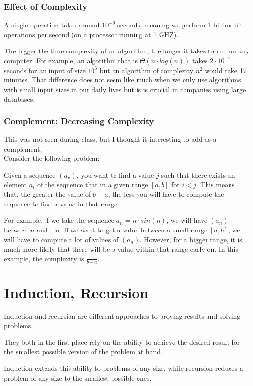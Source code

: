 \documentclass[10pt,a4paper]{book}
\begin{document}
\subsection{Effect of Complexity}
A single operation takes around $10^{-9}$ seconds, meaning we perform 1 billion bit operations per second (on a processor running at 1 GHZ).\par 
The bigger the time complexity of an algorithm, the longer it takes to run on any computer. For example, an algorithm that is $\Theta (n\cdot log(n))$ takes $2\cdot 10^{-2}$ seconds for an input of size $10^6$ but an algorithm of complexity $n^2$ would take 17 minutes. That difference does not seem like much when we only use algorithms with small input sizes in our daily lives but is is crucial in companies using large databases.
\subsection{Complement: Decreasing Complexity}
This was not seen during class, but I thought it interesting to add as a complement. \\
Consider the following problem: \par 
Given a sequence $(a_n)$, you want to find a value $j$ such that there exists an element $a_i$ of the sequence that in a given range $[a,b]$ for $i<j$. This means that, the greater the value of $b-a$, the less you will have to compute the sequence to find a value in that range.\par 
For example, if we take the sequence $a_n = n\cdot sin(n)$, we will have $(a_n)$ between $n$ and $-n$. If we want to get a value between a small range $[a,b]$, we will have to compute a lot of values of $(a_n)$. However, for a bigger range, it is much more likely that there will be a value within that range early on. In this example, the complexity is $\frac{1}{b-a}$.

\chapter{Induction, Recursion}
Induction and recursion are different approaches to proving 
results and solving problems.\par
They both in the first place rely on the ability to achieve the 
desired result for the smallest possible version of the problem 
at hand.\par
Induction extends this ability to problems of any size, while recursion reduces a problem of any size to the smallest 
possible ones.
\end{document}
